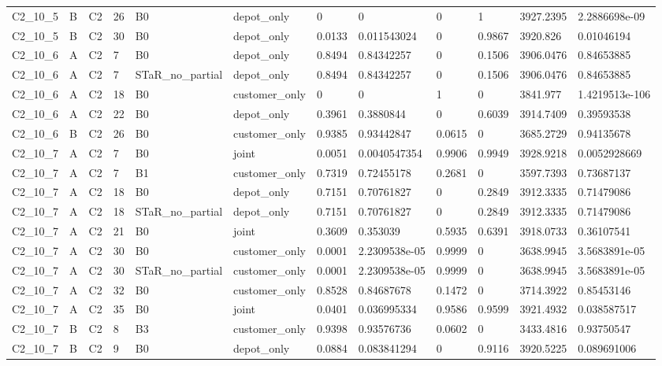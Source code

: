 \begin{longtable}{llllllllllll}
C2\_10\_5 & B & C2 & 26 & B0 & depot\_only & 0 & 0 & 0 & 1 & 3927.2395 & 2.2886698e-09 \\
C2\_10\_5 & B & C2 & 30 & B0 & depot\_only & 0.0133 & 0.011543024 & 0 & 0.9867 & 3920.826 & 0.01046194 \\
C2\_10\_6 & A & C2 & 7 & B0 & depot\_only & 0.8494 & 0.84342257 & 0 & 0.1506 & 3906.0476 & 0.84653885 \\
C2\_10\_6 & A & C2 & 7 & STaR\_no\_partial & depot\_only & 0.8494 & 0.84342257 & 0 & 0.1506 & 3906.0476 & 0.84653885 \\
C2\_10\_6 & A & C2 & 18 & B0 & customer\_only & 0 & 0 & 1 & 0 & 3841.977 & 1.4219513e-106 \\
C2\_10\_6 & A & C2 & 22 & B0 & depot\_only & 0.3961 & 0.3880844 & 0 & 0.6039 & 3914.7409 & 0.39593538 \\
C2\_10\_6 & B & C2 & 26 & B0 & customer\_only & 0.9385 & 0.93442847 & 0.0615 & 0 & 3685.2729 & 0.94135678 \\
C2\_10\_7 & A & C2 & 7 & B0 & joint & 0.0051 & 0.0040547354 & 0.9906 & 0.9949 & 3928.9218 & 0.0052928669 \\
C2\_10\_7 & A & C2 & 7 & B1 & customer\_only & 0.7319 & 0.72455178 & 0.2681 & 0 & 3597.7393 & 0.73687137 \\
C2\_10\_7 & A & C2 & 18 & B0 & depot\_only & 0.7151 & 0.70761827 & 0 & 0.2849 & 3912.3335 & 0.71479086 \\
C2\_10\_7 & A & C2 & 18 & STaR\_no\_partial & depot\_only & 0.7151 & 0.70761827 & 0 & 0.2849 & 3912.3335 & 0.71479086 \\
C2\_10\_7 & A & C2 & 21 & B0 & joint & 0.3609 & 0.353039 & 0.5935 & 0.6391 & 3918.0733 & 0.36107541 \\
C2\_10\_7 & A & C2 & 30 & B0 & customer\_only & 0.0001 & 2.2309538e-05 & 0.9999 & 0 & 3638.9945 & 3.5683891e-05 \\
C2\_10\_7 & A & C2 & 30 & STaR\_no\_partial & customer\_only & 0.0001 & 2.2309538e-05 & 0.9999 & 0 & 3638.9945 & 3.5683891e-05 \\
C2\_10\_7 & A & C2 & 32 & B0 & customer\_only & 0.8528 & 0.84687678 & 0.1472 & 0 & 3714.3922 & 0.85453146 \\
C2\_10\_7 & A & C2 & 35 & B0 & joint & 0.0401 & 0.036995334 & 0.9586 & 0.9599 & 3921.4932 & 0.038587517 \\
C2\_10\_7 & B & C2 & 8 & B3 & customer\_only & 0.9398 & 0.93576736 & 0.0602 & 0 & 3433.4816 & 0.93750547 \\
C2\_10\_7 & B & C2 & 9 & B0 & depot\_only & 0.0884 & 0.083841294 & 0 & 0.9116 & 3920.5225 & 0.089691006 \\

\end{longtable}
